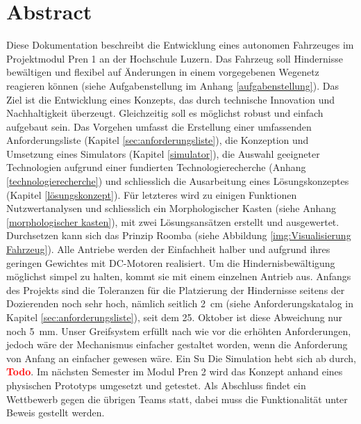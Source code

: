 \newpage
\section{Abstract}

Diese Dokumentation beschreibt die Entwicklung eines autonomen Fahrzeuges im Projektmodul Pren 1 an der Hochschule Luzern. Das Fahrzeug soll Hindernisse bewältigen und flexibel auf Änderungen in einem vorgegebenen Wegenetz reagieren können (siehe Aufgabenstellung im Anhang \ref{aufgabenstellung}). Das Ziel ist die Entwicklung eines Konzepts, das durch technische Innovation und Nachhaltigkeit überzeugt. Gleichzeitig soll es möglichst robust und einfach aufgebaut sein.
Das Vorgehen umfasst die Erstellung einer umfassenden Anforderungsliste (Kapitel \ref{sec:anforderungsliste}), die Konzeption und Umsetzung eines Simulators (Kapitel \ref{simulator}), die Auswahl geeigneter Technologien aufgrund einer fundierten Technologierecherche (Anhang \ref{technologierecherche}) und schliesslich die Ausarbeitung eines Lösungskonzeptes (Kapitel \ref{lösungskonzept}). Für letzteres wird zu einigen Funktionen Nutzwertanalysen und schliesslich ein Morphologischer Kasten (siehe Anhang \ref{morphologischer kasten}), mit zwei Lösungsansätzen erstellt und ausgewertet. Durchsetzen kann sich das Prinzip Roomba (siehe Abbildung \ref{img:Visualisierung Fahrzeug}). Alle Antriebe werden der Einfachheit halber und aufgrund ihres geringen Gewichtes mit DC-Motoren realisiert. Um die Hindernisbewältigung möglichst simpel zu halten, kommt sie mit einem einzelnen Antrieb aus. Anfangs des Projekts sind die Toleranzen für die Platzierung der Hindernisse seitens der Dozierenden noch sehr hoch, nämlich seitlich 2 cm (siehe Anforderungskatalog in Kapitel \ref{sec:anforderungsliste}), seit dem 25. Oktober ist diese Abweichung nur noch 5 mm. Unser Greifsystem erfüllt nach wie vor die erhöhten Anforderungen, jedoch wäre der Mechanismus einfacher gestaltet worden, wenn die Anforderung von Anfang an einfacher gewesen wäre. Ein Su
Die Simulation hebt sich ab durch, \textcolor{red}{\textbf{Todo}}. 
Im nächsten Semester im Modul Pren 2 wird das Konzept anhand eines physischen Prototyps umgesetzt und getestet. Als Abschluss findet ein Wettbewerb gegen die übrigen Teams statt, dabei muss die Funktionalität unter Beweis gestellt werden.

